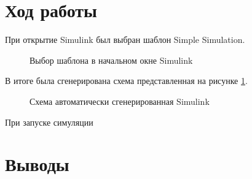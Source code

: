\documentclass[a4paper,14pt]{extarticle}
\begin{document}
\section{Ход работы}

При открытие Simulink был выбран шаблон Simple Simulation.

\begin{figure}[H]
\caption{Выбор шаблона в начальном окне Simulink}
\end{figure}

В итоге была сгенерирована схема представленная на рисунке \ref{001}.

\begin{figure}[H]
\caption{Схема автоматически сгенерированная Simulink}
\label{001}
\end{figure}

При запуске симуляции 

\section{Выводы}
\end{document}
